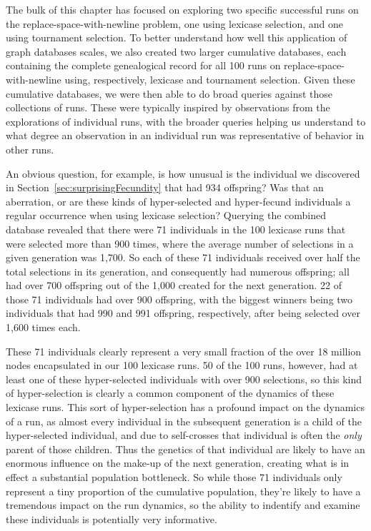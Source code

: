 The bulk of this chapter has focused on exploring two specific successful runs on the replace-space-with-newline problem,
one using lexicase selection, and one using tournament selection. To better understand how well this application of graph
databases scales, we also created two larger cumulative databases, each containing the complete genealogical record for all 
100 runs on replace-space-with-newline using, respectively, lexicase and tournament selection. Given these cumulative 
databases, we were then able to do broad queries against those collections of runs. These were typically inspired by 
observations from the explorations of individual runs, with the broader queries helping us understand to what degree an 
observation in an individual run was representative of behavior in other runs.

An obvious question, for example, is how unusual is the individual we discovered in Section~\ref{sec:surprisingFecundity} 
that had 934 offspring? Was that an aberration, or are these kinds of hyper-selected and hyper-fecund individuals a
regular occurrence when using lexicase selection? Querying the combined database revealed that there were 71 individuals
in the 100 lexicase runs that were selected more than 900 times, where the average number of selections in a given 
generation was 1,700. So each of these 71 individuals received over half the total selections in its generation, and 
consequently had numerous offspring; all had over 700 offspring out of the 1,000 created for the next generation. 22 of
those 71 individuals had over 900 offspring, with the biggest winners being two individuals that had 990 and 991 
offspring, respectively, after being selected over 1,600 times each. 

These 71 individuals clearly represent a very small fraction of the over 18 million nodes encapsulated in our 100 lexicase
runs. 50 of
the 100 runs, however, had at least one of these hyper-selected individuals with over 900 selections, so this kind of 
hyper-selection is clearly a common component of the dynamics of these lexicase runs. This sort of hyper-selection 
has a profound impact on the dynamics of a run, as almost every individual in the subsequent generation is a child of
the hyper-selected individual, and due to self-crosses that individual is often the \emph{only} parent of those children. Thus
the genetics of that individual are likely to have an enormous influence on the make-up of the next generation, creating
what is in effect a substantial population bottleneck. So while those 71 individuals only represent a tiny proportion of
the cumulative population, they're likely to have a tremendous impact on the run dynamics, so the ability to indentify and
examine these individuals is potentially very informative.

